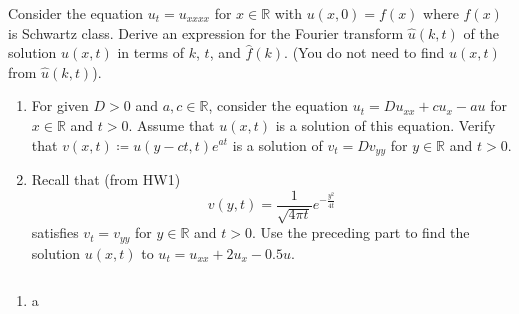\documentclass[plain]{pset}
\begin{document}
\pagebreak

\begin{problem}
Consider the equation \(u_t = u_{xxxx}\) for \(x \in \mathbb{R}\) with \(u(x,0) = f(x)\) where \(f(x)\) is Schwartz class. Derive an expression for the Fourier transform \(\hat{u}(k, t)\) of the solution \(u(x, t)\) in terms of \(k\), \(t\), and \(\hat{f}(k)\). (You do not need to find \(u(x, t)\) from \(\hat{u}(k, t)\)).
\end{problem}
\begin{solution}

\end{solution}

\pagebreak

\begin{problem}
\begin{enumerate}[label = (\alph*)]
    \item For given \(D > 0\) and \(a, c \in \mathbb{R}\), consider the equation \(u_t = Du_{xx} + cu_x - au\) for \(x \in \mathbb{R}\) and \(t > 0\). Assume that \(u(x, t)\) is a solution of this equation. Verify that \(v(x, t) \coloneqq u(y - ct, t)e^{at}\) is a solution of \(v_t = Dv_{yy}\) for \(y \in \mathbb{R}\) and \(t > 0\).
    \item Recall that (from HW1)
          \[v(y, t) = \frac{1}{\sqrt{4\pi t}}e^{-\frac{y^2}{4t}}\]
          satisfies \(v_t = v_{yy}\) for \(y \in \mathbb{R}\) and \(t > 0\). Use the preceding part to find the solution \(u(x, t)\) to \(u_t = u_{xx} + 2u_x - 0.5u\).
\end{enumerate}
\end{problem}
\begin{solution}
    \[\]
    \vspace*{-4em}
    \begin{enumerate}[label = (\alph*)]
        \item a
    \end{enumerate}
\end{solution}
\end{document}
